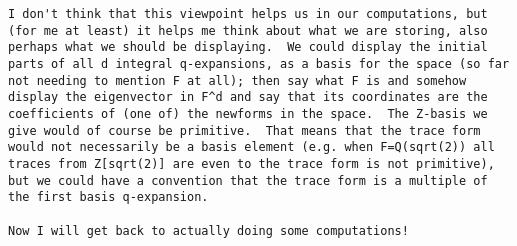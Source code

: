 \documentclass[11pt]{amsart}
\numberwithin{equation}{subsection}
\theoremstyle{definition}
\begin{document}
\begin{verbatim}
I don't think that this viewpoint helps us in our computations, but (for me at least) it helps me think about what we are storing, also perhaps what we should be displaying.  We could display the initial parts of all d integral q-expansions, as a basis for the space (so far not needing to mention F at all); then say what F is and somehow display the eigenvector in F^d and say that its coordinates are the coefficients of (one of) the newforms in the space.  The Z-basis we give would of course be primitive.  That means that the trace form would not necessarily be a basis element (e.g. when F=Q(sqrt(2)) all traces from Z[sqrt(2)] are even to the trace form is not primitive), but we could have a convention that the trace form is a multiple of the first basis q-expansion.

Now I will get back to actually doing some computations!
\end{verbatim}

\begin{thebibliography}{999}

\end{thebibliography}
\end{document}

